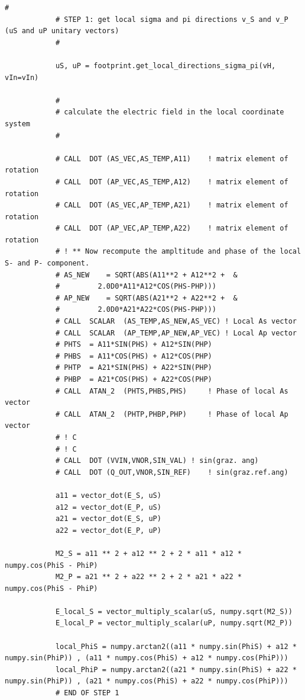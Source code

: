 \documentclass{iucr}
\begin{document}
\begin{lstlisting}[caption={Code to compute the local $\sigma$ and $\pi$ electric fields at the beamline element.}, label={lst:rotationelements}, captionpos=b]
            #
            # STEP 1: get local sigma and pi directions v_S and v_P (uS and uP unitary vectors)
            #

            uS, uP = footprint.get_local_directions_sigma_pi(vH, vIn=vIn)

            #
            # calculate the electric field in the local coordinate system
            #

            # CALL	DOT	(AS_VEC,AS_TEMP,A11)	! matrix element of rotation
            # CALL	DOT	(AP_VEC,AS_TEMP,A12)	! matrix element of rotation
            # CALL	DOT	(AS_VEC,AP_TEMP,A21)	! matrix element of rotation
            # CALL	DOT	(AP_VEC,AP_TEMP,A22)	! matrix element of rotation
            # ! ** Now recompute the ampltitude and phase of the local S- and P- component.
            # AS_NEW	= SQRT(ABS(A11**2 + A12**2 +  &
            #         2.0D0*A11*A12*COS(PHS-PHP)))
            # AP_NEW	= SQRT(ABS(A21**2 + A22**2 +  &
            #         2.0D0*A21*A22*COS(PHS-PHP)))
            # CALL	SCALAR	(AS_TEMP,AS_NEW,AS_VEC)	! Local As vector
            # CALL	SCALAR	(AP_TEMP,AP_NEW,AP_VEC)	! Local Ap vector
            # PHTS	= A11*SIN(PHS) + A12*SIN(PHP)
            # PHBS	= A11*COS(PHS) + A12*COS(PHP)
            # PHTP	= A21*SIN(PHS) + A22*SIN(PHP)
            # PHBP	= A21*COS(PHS) + A22*COS(PHP)
            # CALL	ATAN_2	(PHTS,PHBS,PHS)		! Phase of local As vector
            # CALL	ATAN_2	(PHTP,PHBP,PHP)		! Phase of local Ap vector
            # ! C
            # ! C
            # CALL	DOT	(VVIN,VNOR,SIN_VAL)	! sin(graz. ang)
            # CALL	DOT	(Q_OUT,VNOR,SIN_REF)	! sin(graz.ref.ang)

            a11 = vector_dot(E_S, uS)
            a12 = vector_dot(E_P, uS)
            a21 = vector_dot(E_S, uP)
            a22 = vector_dot(E_P, uP)

            M2_S = a11 ** 2 + a12 ** 2 + 2 * a11 * a12 * numpy.cos(PhiS - PhiP)
            M2_P = a21 ** 2 + a22 ** 2 + 2 * a21 * a22 * numpy.cos(PhiS - PhiP)

            E_local_S = vector_multiply_scalar(uS, numpy.sqrt(M2_S))
            E_local_P = vector_multiply_scalar(uP, numpy.sqrt(M2_P))

            local_PhiS = numpy.arctan2((a11 * numpy.sin(PhiS) + a12 * numpy.sin(PhiP)) , (a11 * numpy.cos(PhiS) + a12 * numpy.cos(PhiP)))
            local_PhiP = numpy.arctan2((a21 * numpy.sin(PhiS) + a22 * numpy.sin(PhiP)) , (a21 * numpy.cos(PhiS) + a22 * numpy.cos(PhiP)))
            # END OF STEP 1
\end{lstlisting}
\end{document}
